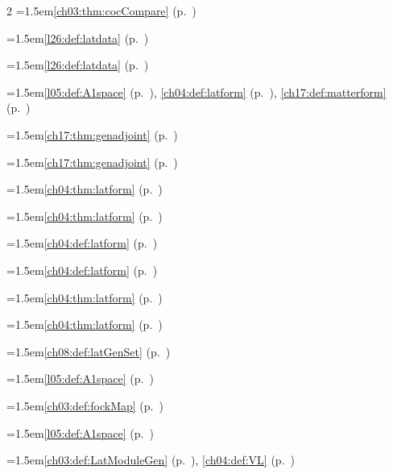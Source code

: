\begin{multicols}{2}
\hangindent=1.5em\quad \ref{ch03:thm:cocCompare} (p.~\pageref{ch03:thm:cocCompare})\par
\hangindent=1.5em\quad \ref{l26:def:latdata} (p.~\pageref{l26:def:latdata})\par
\hangindent=1.5em\quad \ref{l26:def:latdata} (p.~\pageref{l26:def:latdata})\par
\hangindent=1.5em\quad \ref{l05:def:A1space} (p.~\pageref{l05:def:A1space}), \ref{ch04:def:latform} (p.~\pageref{ch04:def:latform}), \ref{ch17:def:matterform} (p.~\pageref{ch17:def:matterform})\par
\hangindent=1.5em\quad \ref{ch17:thm:genadjoint} (p.~\pageref{ch17:thm:genadjoint})\par
\hangindent=1.5em\quad \ref{ch17:thm:genadjoint} (p.~\pageref{ch17:thm:genadjoint})\par
\hangindent=1.5em\quad \ref{ch04:thm:latform} (p.~\pageref{ch04:thm:latform})\par
\hangindent=1.5em\quad \ref{ch04:thm:latform} (p.~\pageref{ch04:thm:latform})\par
\hangindent=1.5em\quad \ref{ch04:def:latform} (p.~\pageref{ch04:def:latform})\par
\hangindent=1.5em\quad \ref{ch04:def:latform} (p.~\pageref{ch04:def:latform})\par
\hangindent=1.5em\quad \ref{ch04:thm:latform} (p.~\pageref{ch04:thm:latform})\par
\hangindent=1.5em\quad \ref{ch04:thm:latform} (p.~\pageref{ch04:thm:latform})\par
\hangindent=1.5em\quad \ref{ch08:def:latGenSet} (p.~\pageref{ch08:def:latGenSet})\par
\hangindent=1.5em\quad \ref{l05:def:A1space} (p.~\pageref{l05:def:A1space})\par
\hangindent=1.5em\quad \ref{ch03:def:fockMap} (p.~\pageref{ch03:def:fockMap})\par
\hangindent=1.5em\quad \ref{l05:def:A1space} (p.~\pageref{l05:def:A1space})\par
\hangindent=1.5em\quad \ref{ch03:def:LatModuleGen} (p.~\pageref{ch03:def:LatModuleGen}), \ref{ch04:def:VL} (p.~\pageref{ch04:def:VL})\par

\end{multicols}
